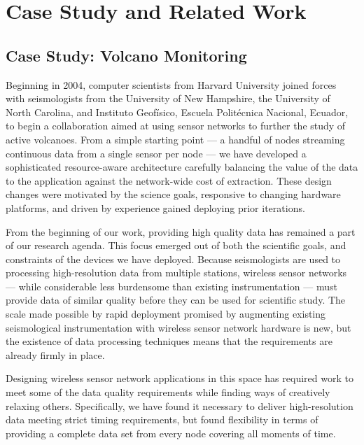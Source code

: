 \chapter{Case Study and Related Work}
\label{chapter-background}


\section{Case Study: Volcano Monitoring}

Beginning in 2004, computer scientists from Harvard University joined forces
with seismologists from the University of New Hampshire, the University of
North Carolina, and Instituto Geof\'{i}sico, Escuela Polit\'{e}cnica
Nacional, Ecuador, to begin a collaboration aimed at using sensor networks to
further the study of active volcanoes.  From a simple starting point --- a
handful of nodes streaming continuous data from a single sensor per node ---
we have developed a sophisticated resource-aware architecture carefully
balancing the value of the data to the application against the network-wide
cost of extraction. These design changes were motivated by the science goals,
responsive to changing hardware platforms, and driven by experience gained
deploying prior iterations. 

From the beginning of our work, providing high quality data has remained a
part of our research agenda. This focus emerged out of both the scientific
goals, and constraints of the devices we have deployed. Because seismologists
are used to processing high-resolution data from multiple stations, wireless
sensor networks --- while considerable less burdensome than existing
instrumentation --- must provide data of similar quality before they can be
used for scientific study. The scale made possible by rapid deployment
promised by augmenting existing seismological instrumentation with wireless
sensor network hardware is new, but the existence of data processing
techniques means that the requirements are already firmly in place.

Designing wireless sensor network applications in this space has required
work to meet some of the data quality requirements while finding ways of
creatively relaxing others. Specifically, we have found it necessary to
deliver high-resolution data meeting strict timing requirements, but found
flexibility in terms of providing a complete data set from every node
covering all moments of time.

